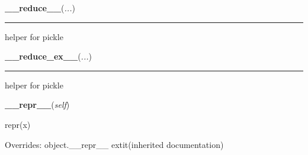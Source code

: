    \label{object:__reduce__}

    \vspace{0.5ex}

    \begin{boxedminipage}{\textwidth}

    \raggedright \textbf{\_\_reduce\_\_}(\textit{...})

    \vspace{-1.5ex}

    \rule{\textwidth}{0.5\fboxrule}
    helper for pickle

    \vspace{1ex}

    \end{boxedminipage}

    \label{object:__reduce_ex__}

    \vspace{0.5ex}

    \begin{boxedminipage}{\textwidth}

    \raggedright \textbf{\_\_reduce\_ex\_\_}(\textit{...})

    \vspace{-1.5ex}

    \rule{\textwidth}{0.5\fboxrule}
    helper for pickle

    \vspace{1ex}

    \end{boxedminipage}

    \vspace{0.5ex}

    \begin{boxedminipage}{\textwidth}

    \raggedright \textbf{\_\_repr\_\_}(\textit{self})

    repr(x)

    \vspace{1ex}

      Overrides: object.\_\_repr\_\_ 	extit{(inherited documentation)}

    \end{boxedminipage}

    \label{object:__setattr__}

    \vspace{0.5ex}

